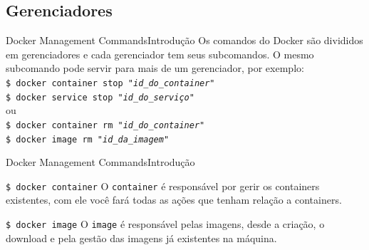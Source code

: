 \documentclass[10pt]{beamer}
\begin{document}
\subsection{Gerenciadores}
\begin{frame}{Docker Management Commands}{Introdução}
    Os comandos do Docker são divididos em gerenciadores e cada gerenciador tem seus subcomandos. O mesmo subcomando pode servir para mais de um gerenciador, por exemplo:\\[.5cm]
    \pause
    \texttt{\$ docker container stop \textit{"id\_do\_container"}}\\
    \texttt{\$ docker service stop \textit{"id\_do\_serviço"}}\\[.5cm]
    \pause
    ou\\[.5cm]
    \texttt{\$ docker container rm \textit{"id\_do\_container"}}\\
    \texttt{\$ docker image rm \textit{"id\_da\_imagem"}}
\end{frame}
\begin{frame}{Docker Management Commands}{Introdução}
    \begin{block}{\texttt{\$ docker container}}
        O \texttt{container} é responsável por gerir os containers existentes, com ele você fará todas as ações que tenham relação a containers.\\
        \centering
    \end{block}
    \pause
    \begin{block}{\texttt{\$ docker image}}
        O \texttt{image} é responsável pelas imagens, desde a criação, o download e pela gestão das imagens já existentes na máquina.\\
        \centering
        \indent{}
    \end{block}
\end{frame}
\end{document}

